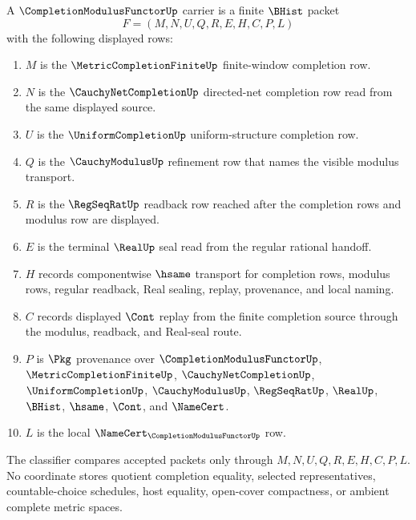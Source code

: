 \begin{definition}
\label{def:completion-modulus-functor-carrier}
A $\CompletionModulusFunctorUp$ carrier is a finite $\BHist$ packet
$$
F=(M,N,U,Q,R,E,H,C,P,L)
$$
with the following displayed rows:
\begin{enumerate}
\item $M$ is the $\MetricCompletionFiniteUp$ finite-window completion row.
\item $N$ is the $\CauchyNetCompletionUp$ directed-net completion row read from the same displayed source.
\item $U$ is the $\UniformCompletionUp$ uniform-structure completion row.
\item $Q$ is the $\CauchyModulusUp$ refinement row that names the visible modulus transport.
\item $R$ is the $\RegSeqRatUp$ readback row reached after the completion rows and modulus row are displayed.
\item $E$ is the terminal $\RealUp$ seal read from the regular rational handoff.
\item $H$ records componentwise $\hsame$ transport for completion rows, modulus rows, regular readback, Real sealing, replay, provenance, and local naming.
\item $C$ records displayed $\Cont$ replay from the finite completion source through the modulus, readback, and Real-seal route.
\item $P$ is $\Pkg$ provenance over $\CompletionModulusFunctorUp$, $\MetricCompletionFiniteUp$, $\CauchyNetCompletionUp$, $\UniformCompletionUp$, $\CauchyModulusUp$, $\RegSeqRatUp$, $\RealUp$, $\BHist$, $\hsame$, $\Cont$, and $\NameCert$.
\item $L$ is the local $\NameCert_{\CompletionModulusFunctorUp}$ row.
\end{enumerate}
The classifier compares accepted packets only through $M,N,U,Q,R,E,H,C,P,L$. No coordinate stores quotient completion equality, selected representatives, countable-choice schedules, host equality, open-cover compactness, or ambient complete metric spaces.
\end{definition}

